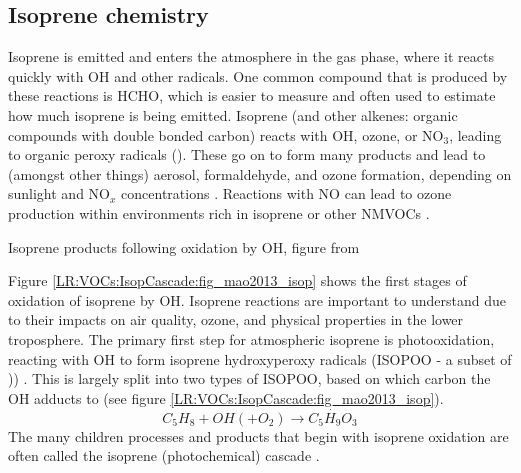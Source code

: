   \subsection{Isoprene chemistry}
    \label{LR:VOCs:IsopCascade}
    
    Isoprene is emitted and enters the atmosphere in the gas phase, where it reacts quickly with OH and other radicals.
    One common compound that is produced by these reactions is HCHO, which is easier to measure and often used to estimate how much isoprene is being emitted.
    Isoprene (and other alkenes: organic compounds with double bonded carbon) reacts with OH, ozone, or NO$_3$, leading to organic peroxy radicals (\roo).
    These go on to form many products and lead to (amongst other things) aerosol, formaldehyde, and ozone formation, depending on sunlight and NO$_x$ concentrations \parencite{Atkinson2000}.
    Reactions with NO can lead to ozone production within environments rich in isoprene or other NMVOCs \parencite{Patchen2007,AtkinsonArey2003}.
    
      {Isoprene products following oxidation by OH, figure from \textcite{Mao2013}}
      {\label{LR:VOCs:IsopCascade:fig_mao2013_isop}}
    
    Figure \ref{LR:VOCs:IsopCascade:fig_mao2013_isop} shows the first stages of oxidation of isoprene by OH.
    Isoprene reactions are important to understand due to their impacts on air quality, ozone, and physical properties in the lower troposphere.
    The primary first step for atmospheric isoprene is photooxidation, reacting with OH to form isoprene hydroxyperoxy radicals (ISOPOO - a subset of \roo)) \parencite{Patchen2007,Wolfe2016,Marvin2017}.
    This is largely split into two types of ISOPOO, based on which carbon the OH adducts to (see figure \ref{LR:VOCs:IsopCascade:fig_mao2013_isop}).
    \begin{equation} \label{LR:VOCs:IsopCascade:eqn_IsopToIsopoo}
    C_5H_8 + OH (+ O_2) \rightarrow \dot{C_5H_9O_3}
    \end{equation}
    The many children processes and products that begin with isoprene oxidation are often called the isoprene (photochemical) cascade \parencite[eg.][]{Crounse2012,Paulot2012,Wolfe2016}.
    
    
    
